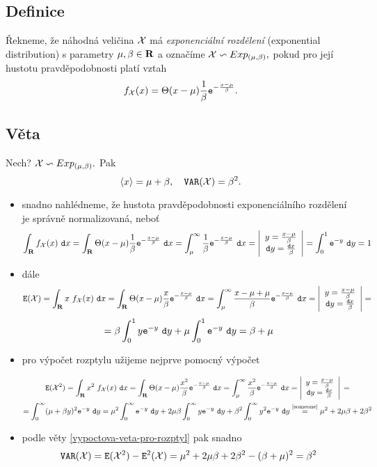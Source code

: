\subsection{Definice}
Řekneme, že náhodná veličina ${\mathcal X}$ má \emph{exponenciální rozdělení}
(exponential distribution) s parametry $\mu, \beta \in {\mathbf R}$ a
označíme ${\mathcal X} \backsim Exp_{(\mu,\beta)},$ pokud pro její hustotu
pravděpodobnosti platí vztah $$ f_{\mathcal X}(x) =
\Theta(x-\mu)\frac{1}{\beta}\mathtt{e}^{-\frac{x-\mu}{\beta}}.$$

\subsection{Věta}
Nech? ${\mathcal X} \backsim Exp_{(\mu,\beta)}.$ Pak $$\langle x \rangle = \mu+\beta,
\quad \mathtt{VAR}({\mathcal X})=\beta^{2}.$$ \Proof

\begin{itemize}
\item snadno nahl\'edneme, \v ze hustota pravd\v epodobnosti exponenci\'aln\'iho rozdělení je spr\'avn\v e normalizovan\'a, nebo\v t
%
$$\int_{\mathbf R} f_{\mathcal X}(x)~\mathtt{d}x=\int_{\mathbf R} \Theta(x-\mu)\frac{1}{\beta}\mathtt{e}^{-\frac{x-\mu}{\beta}}~\mathtt{d}x=\int_\mu^\infty \frac{1}{\beta}\mathtt{e}^{-\frac{x-\mu}{\beta}}~\mathtt{d}x=\left|\begin{array}{c} y=\frac{x-\mu}{\beta}\\ \mathtt{d}y=\frac{\mathtt{d}x}{\beta} \end{array}\right|=\int_0^1 \mathtt{e}^{-y}~\mathtt{d}y= 1$$

\item d\'ale $$\mathtt{E}({\mathcal X}) = \int_{\mathbf R} x~f_{\mathcal X}(x)~\mathtt{d}x=\int_{\mathbf R} \Theta(x-\mu)\frac{x}{\beta}\mathtt{e}^{-\frac{x-\mu}{\beta}}~\mathtt{d}x=\int_\mu^\infty \frac{x-\mu+\mu}{\beta}\mathtt{e}^{-\frac{x-\mu}{\beta}}~\mathtt{d}x=\left|\begin{array}{c} y=\frac{x-\mu}{\beta}\\ \mathtt{d}y=\frac{\mathtt{d}x}{\beta} \end{array}\right|=$$
%
$$=\beta \int_0^1 y \mathtt{e}^{-y}~\mathtt{d}y + \mu \int_0^1 \mathtt{e}^{-y}~\mathtt{d}y = \beta+\mu$$

%

\item pro v\'ypo\v cet rozptylu u\v zijeme nejprve pomocn\'y v\'ypo\v cet

%
\begin{multline*}
\mathtt{E}({\mathcal X}^2) = \int_{\mathbf R} x^2~f_{\mathcal X}(x)~\mathtt{d}x=\int_{\mathbf R} \Theta(x-\mu)\frac{x^2}{\beta}\mathtt{e}^{-\frac{x-\mu}{\beta}}~\mathtt{d}x=\int_\mu^\infty \frac{x^2}{\beta}\mathtt{e}^{-\frac{x-\mu}{\beta}}~\mathtt{d}x=\left|\begin{array}{c} y=\frac{x-\mu}{\beta}\\ \mathtt{d}y=\frac{\mathtt{d}x}{\beta} \end{array}\right|{}=\\
= \int_0^\infty (\mu+\beta y)^2 \mathtt{e}^{-y}~\mathtt{d}y=\mu^2 \int_0^\infty \mathtt{e}^{-y}~\mathtt{d}y +2\mu\beta \int_0^\infty y\mathtt{e}^{-y}~\mathtt{d}y+\beta^2 \int_0^\infty y^2\mathtt{e}^{-y}~\mathtt{d}y \stackrel{\text{\eqref{someone}}}{=}  \mu^2 +2\mu\beta+ 2\beta^2
\end{multline*}
%

\item podle v\v ety \ref{vypoctova-veta-pro-rozptyl} pak snadno
%
$$\mathtt{VAR}({\mathcal X})=\mathtt{E}({\mathcal X}^2)-\mathtt{E}^2({\mathcal X})=\mu^2 +2\mu\beta+ 2\beta^2 - (\beta+\mu)^2=\beta^2$$

\end{itemize}


